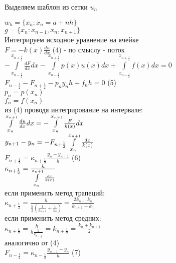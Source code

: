 Выделяем шаблон из сетки $u_n$\\
\begin{figure}[H]
	\center{\texttt{[image: a\_4]}}
\end{figure}

$w_h = \{x_n: x_n = a + nh\}$\\
$g = \{x_n: x_{n-1}, x_n, x_{n+1}\}$\\

Интегрируем исходное уравнение на ячейке\\

$F = -k(x)\frac{du}{dx}$ (4) - по смыслу - поток\\
$-\int\limits_{x_{n-\frac{1}{2}}}^{x_{n+\frac{1}{2}}} \frac{dF}{dx} dx - \int\limits_{x_{n-\frac{1}{2}}}^{x_{n+\frac{1}{2}}} p(x) u(x)dx + \int\limits^{x_{n+\frac{1}{2}}}_{x_{n-\frac{1}{2}}}f(x)dx = 0$\\

$F_{n-\frac{1}{2}} - F_{n + \frac{1}{2}} - p_n y_n h + f_n h = 0$ (5)\\
$p_n = p(x_n)$\\
$f_n = f(x_n)$\\

из (4) проводя интегрирование на интервале:\\
$\int\limits_{x_n}^{x_{n+1}} \frac{du}{dx} dx = -\int\limits_{x_n}^{x_{n+1}} \frac{F}{k(x)} dx$\\
$y_{n+1} - y_n = -F_{n+\frac{1}{2}} \int\limits_{x_n}^{x_{n+1}} \frac{dx}{k(x)}$\\
$F_{n+\frac{1}{2}} = \kappa_{n+\frac{1}{2}} \frac{y_n - y_{n+1}}{h}$ (6)\\
$\kappa_{n+\frac{1}{2}} = \frac{h}{\int\limits_{x_n}^{x_{n+1}} \frac{dx}{k(x)}}$\\

если применить метод трапеций:\\
$\kappa_{n+\frac{1}{2}} = \frac{h}{\frac{h}{2}(\frac{1}{k_{n+1}} + \frac{1}{k_n})} = \frac{2k_{n+1} k_n}{k_{n+1} + k_n}$\\

если применить метод средних:\\
$\kappa_{n+\frac{1}{2}} = \frac{h}{h \frac{1}{k_{n+\frac{1}{2}}}} = k_{n+\frac{1}{2}} = \frac{k_n + k_{n+1}}{2}$\\

аналогично от (4)\\

$F_{n-\frac{1}{2}} = \kappa_{n-\frac{1}{2}} \frac{y_{n-1} - y_n}{h}$ (7)\\

